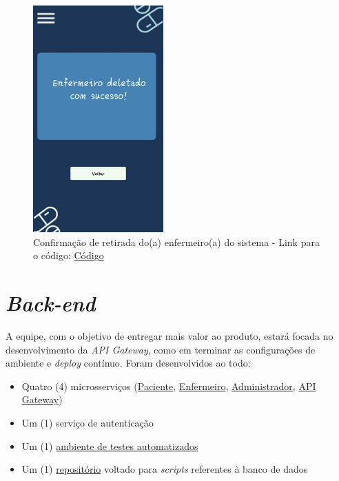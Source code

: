 \begin{apendicesenv}
\begin{figure}[H]
    \centering
    \includegraphics[width=5cm]{figuras/software/telas_frontend/front_ConfirmarEnfermeiroDeletado.jpg}
    \caption{Confirmação de retirada do(a) enfermeiro(a) do sistema - Link para o código: \href{https://github.com/PillWatcher/pillwatcher-dpf-service/blob/dev/components/confirmarEnfermeiroDeletado.js}{Código}}
    \label{fig:confirmar_retirada_enfermeiro}
\end{figure}



\section{\textit{Back-end}}

A equipe, com o objetivo de entregar mais valor ao produto, estará focada no desenvolvimento da \textit{API Gateway}, como em terminar as configurações de ambiente e \textit{deploy} contínuo.
Foram desenvolvidos ao todo:
\begin{itemize}
    \item Quatro (4) microsserviços (\href{https://github.com/PillWatcher/pillwatcher-dpb-patient-service}{Paciente}, \href{https://github.com/PillWatcher/pillwatcher-dpb-nursing-service}{Enfermeiro}, \href{https://github.com/PillWatcher/pillwatcher-dpb-admin-service}{Administrador}, \href{https://github.com/PillWatcher/pillwatcher-api-gateway}{API Gateway})
    \item Um (1) serviço de autenticação
    \item Um (1) \href{https://github.com/PillWatcher/postman-config}{ambiente de testes automatizados}
    \item Um (1) \href{https://github.com/PillWatcher/database-scripts}{repositório} voltado para \textit{scripts} referentes à banco de dados
\end{itemize}


\end{apendicesenv}

